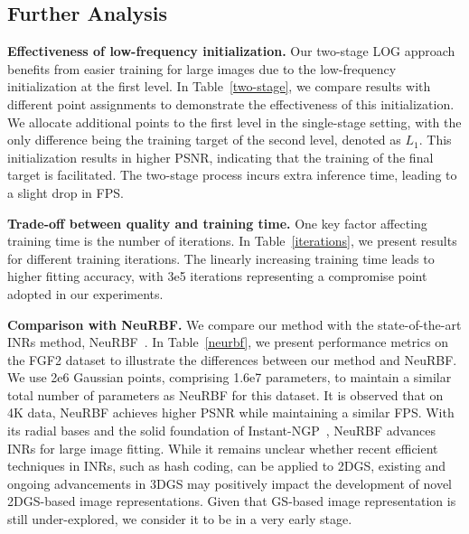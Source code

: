 \begin{table}[h]
  \centering
  \caption{\textbf{Comparison between LIG and NeuRBF on FGF2.} Given the similar total parameters for optimization, NeuRBF performs higher in PSNR while remains high FPS.}
 \label{neurbf}
\end{table}

\subsection{Further Analysis}
\textbf{Effectiveness of low-frequency initialization.} Our two-stage LOG approach benefits from easier training for large images due to the low-frequency initialization at the first level. In Table~\ref{two-stage}, we compare results with different point assignments to demonstrate the effectiveness of this initialization. We allocate additional points to the first level in the single-stage setting, with the only difference being the training target of the second level, denoted as $L_1$. This initialization results in higher PSNR, indicating that the training of the final target is facilitated. The two-stage process incurs extra inference time, leading to a slight drop in FPS.

\noindent \textbf{Trade-off between quality and training time.} One key factor affecting training time is the number of iterations. In Table~\ref{iterations}, we present results for different training iterations. The linearly increasing training time leads to higher fitting accuracy, with 3e5 iterations representing a compromise point adopted in our experiments.

\noindent \textbf{Comparison with NeuRBF.} We compare our method with the state-of-the-art INRs method, NeuRBF~\cite{chen2023neurbf}. In Table~\ref{neurbf}, we present performance metrics on the FGF2 dataset to illustrate the differences between our method and NeuRBF. We use 2e6 Gaussian points, comprising 1.6e7 parameters, to maintain a similar total number of parameters as NeuRBF for this dataset. It is observed that on 4K data, NeuRBF achieves higher PSNR while maintaining a similar FPS. With its radial bases and the solid foundation of Instant-NGP~\cite{muller2022instant}, NeuRBF advances INRs for large image fitting. While it remains unclear whether recent efficient techniques in INRs, such as hash coding, can be applied to 2DGS, existing and ongoing advancements in 3DGS may positively impact the development of novel 2DGS-based image representations. Given that GS-based image representation is still under-explored, we consider it to be in a very early stage.